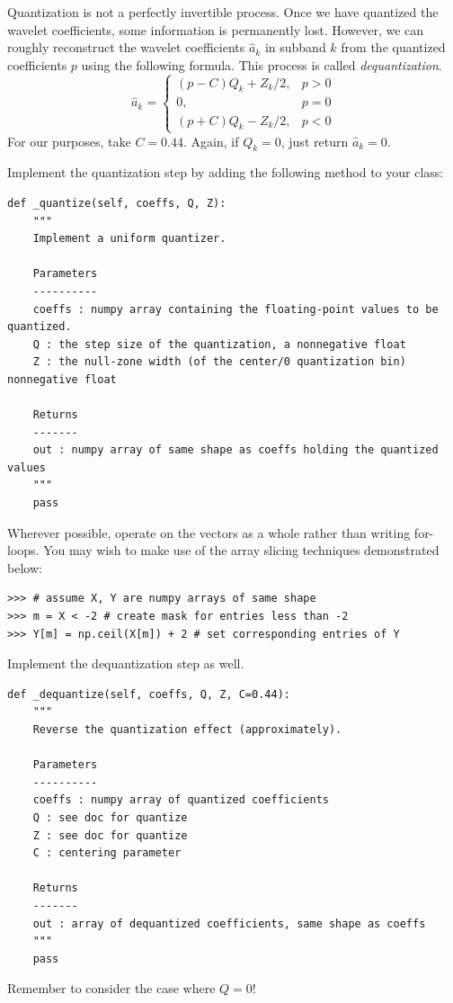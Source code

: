 Quantization is not a perfectly invertible process. Once we have quantized
the wavelet coefficients, some information is permanently lost. However, we can
roughly reconstruct the wavelet coefficients $\hat{a}_k$ in subband $k$ from the quantized coefficients
$p$ using the following formula.
This process is called \emph{dequantization}.
\[
\hat{a}_k =
\begin{cases}
(p-C)Q_k + Z_k/2, & p> 0\\
0, & p = 0\\
(p + C)Q_k - Z_k/2, & p < 0
\end{cases}
\]
For our purposes, take $C = 0.44$. Again, if $Q_k = 0$, just return $\hat{a}_k = 0$.
\begin{problem}
Implement the quantization step by adding the following method to your class:
\begin{lstlisting}
def _quantize(self, coeffs, Q, Z):
    """
    Implement a uniform quantizer.

    Parameters
    ----------
    coeffs : numpy array containing the floating-point values to be quantized.
    Q : the step size of the quantization, a nonnegative float
    Z : the null-zone width (of the center/0 quantization bin) nonnegative float

    Returns
    -------
    out : numpy array of same shape as coeffs holding the quantized values
    """
    pass
\end{lstlisting}
Wherever possible, operate on the vectors as a whole rather than writing for-loops.
You may wish to make use of the array slicing techniques demonstrated below:
\begin{lstlisting}
>>> # assume X, Y are numpy arrays of same shape
>>> m = X < -2 # create mask for entries less than -2
>>> Y[m] = np.ceil(X[m]) + 2 # set corresponding entries of Y
\end{lstlisting}

Implement the dequantization step as well.
\begin{lstlisting}
def _dequantize(self, coeffs, Q, Z, C=0.44):
    """
    Reverse the quantization effect (approximately).

    Parameters
    ----------
    coeffs : numpy array of quantized coefficients
    Q : see doc for quantize
    Z : see doc for quantize
    C : centering parameter

    Returns
    -------
    out : array of dequantized coefficients, same shape as coeffs
    """
    pass
\end{lstlisting}
Remember to consider the case where $Q=0$!


\end{problem}
